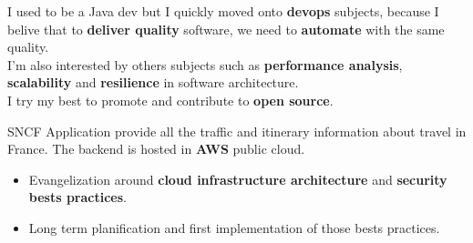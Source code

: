 \documentclass[10pt,a4paper,ragged2e]{altacv}
\begin{document}

\begin{fullwidth}
\makecvheader
\end{fullwidth}


	\quad I used to be a Java dev but I quickly moved onto \textbf{devops} subjects, because I belive that to \textbf{deliver quality} software, 
	we need to \textbf{automate} with the same quality.
	\\
	\medskip
	\quad I'm also interested by others subjects such as \textbf{performance analysis}, \textbf{scalability} and \textbf{resilience} in software architecture.
	\\
	\medskip
	\quad I try my best to promote and contribute to \textbf{open source}.


\bigskip
{}
		
		SNCF Application provide all the traffic and itinerary information about travel in France. The backend is hosted in \textbf{AWS} public cloud.
		
		\medskip
		\begin{itemize}	
			\item Evangelization around \textbf{cloud infrastructure architecture} and \textbf{security bests practices}.
			\item Long term planification and first implementation of those bests practices.
		\end{itemize}
	\divider
\end{document}

